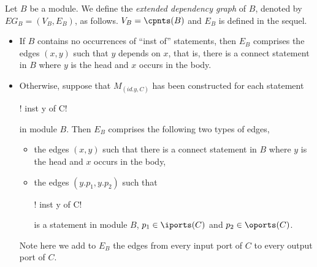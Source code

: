 {\begin{itemize}
Let $B$ be a module. We define the \emph{extended dependency graph} of $B$, denoted by $EG_B = (V_B, E_B)$, as follows. $V_B = \cpnts(B)$ and $E_B$ is defined in the sequel.
\begin{itemize}
\item If $B$ contains no occurrences of ``inst of'' statements, then $E_B$ comprises the edges $(x, y)$ such that $y$ depends on $x$, that is, there is a connect statement in $B$ where $y$ is the head and $x$ occurs in the body.
%
\item Otherwise, suppose that $M_{(id.y, C)}$ has been constructed for each statement \begin{lstinline}! inst y of C!\end{lstinline} in module $B$. Then
$E_B$ comprises the following two types of edges,
\begin{itemize}
\item the edges $(x, y)$ such that there is a connect statement in $B$ where $y$ is the head and $x$ occurs in the body,
%
\item the edges $(y.p_1, y.p_2)$ such that \begin{lstinline}! inst y of C!\end{lstinline} is a  statement in module $B$, $p_1 \in \iports(C)$ and $p_2 \in \oports(C)$.
\end{itemize}
Note here we add to $E_B$ the edges from every input port of $C$ to every output port of $C$.
\end{itemize}


\end{itemize}}

